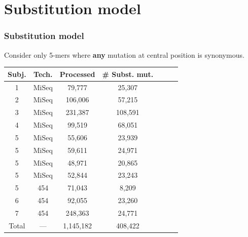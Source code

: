 \documentclass{beamer}\usepackage[]{graphicx}\usepackage[]{color}
\begin{document}
\section{Substitution model}

\begin{frame}
    \frametitle{Substitution model}
    Consider only 5-mers where \textbf{any} mutation at central position is synonymous.
    { \footnotesize
    \begin{table}[]
    \centering
    \begin{tabular}{ccccccc}
    \hline
    \multicolumn{1}{|c|}{\bf Subj.}   & \multicolumn{1}{c|}{\bf Tech.} & \multicolumn{1}{c|}{\bf Processed} & \multicolumn{1}{c|}{\# \bf Subst. mut.}  \\ \hline
    \multicolumn{1}{|c|}{1}           & \multicolumn{1}{c|}{MiSeq}     & \multicolumn{1}{c|}{79,777   }     & \multicolumn{1}{c|}{25,307 }           \\
    \multicolumn{1}{|c|}{2}           & \multicolumn{1}{c|}{MiSeq}     & \multicolumn{1}{c|}{106,006  }     & \multicolumn{1}{c|}{57,215 }           \\
    \multicolumn{1}{|c|}{3}           & \multicolumn{1}{c|}{MiSeq}     & \multicolumn{1}{c|}{231,387  }     & \multicolumn{1}{c|}{108,591}           \\
    \multicolumn{1}{|c|}{4}           & \multicolumn{1}{c|}{MiSeq}     & \multicolumn{1}{c|}{99,519   }     & \multicolumn{1}{c|}{68,051 }           \\ \cline{1-4}
    \multicolumn{1}{|c|}{5}           & \multicolumn{1}{c|}{MiSeq}     & \multicolumn{1}{c|}{55,606   }     & \multicolumn{1}{c|}{23,939 }           \\
    \multicolumn{1}{|c|}{5}           & \multicolumn{1}{c|}{MiSeq}     & \multicolumn{1}{c|}{59,611   }     & \multicolumn{1}{c|}{24,971 }           \\
    \multicolumn{1}{|c|}{5}           & \multicolumn{1}{c|}{MiSeq}     & \multicolumn{1}{c|}{48,971   }     & \multicolumn{1}{c|}{20,865 }           \\
    \multicolumn{1}{|c|}{5}           & \multicolumn{1}{c|}{MiSeq}     & \multicolumn{1}{c|}{52,844   }     & \multicolumn{1}{c|}{23,243 }           \\ \cline{1-4}
    \multicolumn{1}{|c|}{5}           & \multicolumn{1}{c|}{454}       & \multicolumn{1}{c|}{71,043   }     & \multicolumn{1}{c|}{8,209  }           \\
    \multicolumn{1}{|c|}{6}           & \multicolumn{1}{c|}{454}       & \multicolumn{1}{c|}{92,055   }     & \multicolumn{1}{c|}{23,260 }           \\
    \multicolumn{1}{|c|}{7}           & \multicolumn{1}{c|}{454}       & \multicolumn{1}{c|}{248,363  }     & \multicolumn{1}{c|}{24,771 }           \\ \hline
    \multicolumn{1}{|c|}{Total}       & \multicolumn{1}{c|}{---}       & \multicolumn{1}{c|}{1,145,182}     & \multicolumn{1}{c|}{408,422}           \\ \cline{1-4}
    \end{tabular}
    \end{table}
    }
\end{frame}
\end{document}
